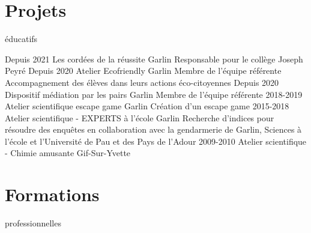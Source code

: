 \documentclass{cv-style-cec}
\begin{document}
\section{Projets }{éducatifs}
\vspace{-1.4ex}
\begin{entrylist}
\entry
{Depuis 2021}
{Les cordées de la réussite}
{Garlin}
{Responsable pour le collège Joseph Peyré}
\entry
{Depuis 2020}
{Atelier Ecofriendly}
{Garlin}
{Membre de l'équipe référente\\ Accompagnement des élèves dans leurs actions éco-citoyennes}
\entry
{Depuis 2020}
{Dispositif médiation par les pairs}
{Garlin}
{Membre de l'équipe référente}
\entry
{2018-2019}
{Atelier scientifique escape game}
{Garlin}
{Création d'un escape game}
\entry
{2015-2018}
{Atelier scientifique - EXPERTS à l'école}
{Garlin}
{Recherche d'indices pour résoudre des enquêtes en collaboration avec la 
gendarmerie de Garlin, Sciences à l'école et l'Université de Pau et des Pays 
de l'Adour}
\entry
{2009-2010}
{Atelier scientifique - Chimie amusante}
{Gif-Sur-Yvette}
{}
\end{entrylist}

\vspace{-3.4ex}
\section{Formations}{ professionnelles}
\vspace{-1.4ex}
\end{document}
